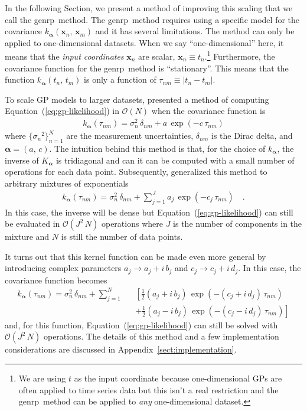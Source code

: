 \documentclass[manuscript, letterpaper]{aastex6}
\makeatletter
\let\origsection\section
\renewcommand\section{\@ifstar{\starsection}{\nostarsection}}
\newcommand\nostarsection[1]{\sectionprelude\origsection{#1}}
\newcommand\starsection[1]{\sectionprelude\origsection*{#1}}
\newcommand\sectionprelude{\vspace{1em}}
\newcommand{\project}[1]{\textsf{#1}}
\newcommand{\genrp}{\project{genrp}}
\renewcommand{\eqref}[1]{\ref{eq:#1}}
\newcommand{\Eq}[1]{Equation~(\eqref{#1})}
\newcommand{\eq}[1]{\Eq{#1}}
\newcommand{\eqlabel}[1]{\label{eq:#1}}
\newcommand{\sectref}[1]{\ref{sect:#1}}
\newcommand{\App}[1]{Appendix~\sectref{#1}}
\newcommand{\app}[1]{\App{#1}}
\newcommand{\bvec}[1]{{\ensuremath{\boldsymbol{#1}}}}
\makeatother
\begin{document}
In the following Section, we present a method of improving this scaling that
we call the \genrp\ method.
The \genrp\ method requires using a specific model for the covariance
$k_\bvec{\alpha}(\bvec{x}_n,\,\bvec{x}_m)$ and it has several limitations.
The method can only be applied to one-dimensional datasets.
When we say ``one-dimensional'' here, it means that the \emph{input
coordinates} $\bvec{x}_n$ are scalar, $\bvec{x}_n \equiv t_n$.\footnote{We are
using $t$ as the input coordinate because one-dimensional GPs are often
applied to time series data but this isn't a real restriction and the \genrp\
method can be applied to \emph{any} one-dimensional dataset.}
Furthermore, the covariance function for the \genrp\ method is ``stationary''.
This means that the function $k_\bvec{\alpha}(t_n,\,t_m)$ is only a function
of $\tau_{nm} \equiv |t_n - t_m|$.


\section{The genrp model}

To scale GP models to larger datasets, \citet{Rybicki:1995} presented a method
of computing \eq{gp-likelihood} in $\mathcal{O}(N)$ when the covariance
function is
\begin{eqnarray}
k_\bvec{\alpha}(\tau_{nm}) = \sigma_n^2\,\delta_{nm} + a\,\exp(-c\,\tau_{nm})
\end{eqnarray}
where $\{{\sigma_n}^2\}_{n=1}^N$ are the measurement uncertainties,
$\delta_{nm}$ is the Dirac delta, and $\bvec{\alpha} = (a,\,c)$.
The intuition behind this method is that, for the choice of $k_\bvec{\alpha}$,
the inverse of $K_\bvec{\alpha}$ is tridiagonal and can it can be computed
with a small number of operations for each data point.
Subsequently, \citet{Ambikasaran:2015} generalized this method to arbitrary
mixtures of exponentials
\begin{eqnarray}
k_\bvec{\alpha}(\tau_{nm}) = \sigma_n^2\,\delta_{nm} +
    \sum_{j=1}^J a_j\,\exp(-c_j\,\tau_{nm})\quad.
\end{eqnarray}
In this case, the inverse will be dense but \eq{gp-likelihood} can still be
evaluated in $\mathcal{O}(J^2\,N)$ operations where $J$ is the number of
components in the mixture and $N$ is still the number of data points.

It turns out that this kernel function can be made even more general by
introducing complex parameters $a_j \to a_j+i\,b_j$ and $c_j \to c_j+i\,d_j$.
In this case, the covariance function becomes
\begin{eqnarray}\eqlabel{genrp-kernel-complex}
k_\bvec{\alpha}(\tau_{nm}) = \sigma_n^2\,\delta_{nm} +
    \sum_{j=1}^N &&\left[
    \frac{1}{2}(a_j + i\,b_j)\,\exp\left(-(c_j+i\,d_j)\,\tau_{nm}\right)
        \right. \nonumber\\
    &&+\left.
    \frac{1}{2}(a_j - i\,b_j)\,\exp\left(-(c_j-i\,d_j)\,\tau_{nm}\right)
\right]
\end{eqnarray}
and, for this function, \eq{gp-likelihood} can still be solved with
$\mathcal{O}(J^2\,N)$ operations.
The details of this method and a few implementation considerations are
discussed in \app{implementation}.
\end{document}
